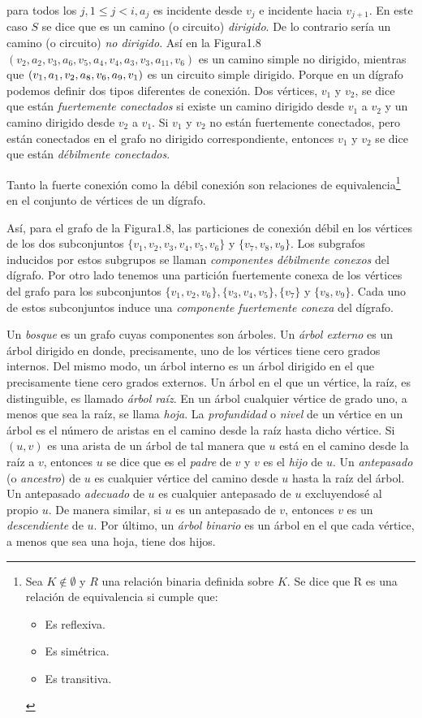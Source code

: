 \documentclass[10pt,a5paper]{book}
\begin{document}
para todos los $j, 1 \le j < i, a_j$ es incidente desde $v_j$ e incidente hacia $v_{j+1}$. En este caso $S$ se dice que es un camino (o circuito) \emph{dirigido}. De lo contrario sería un camino (o circuito) \emph{no dirigido}. Así en la Figura1.8 $(v_2,a_2,v_3,a_6,v_5,a_4,v_4,a_3,v_3,a_{11},v_6)$ es un camino simple no dirigido, mientras que $(v_1,a_1,v_2,a_8,v_6,\\a_9,v_1)$ es un circuito simple dirigido. Porque en un dígrafo podemos definir dos tipos diferentes de conexión. Dos vértices, $v_1$ y $v_2$, se dice que están \emph{fuertemente conectados} si existe un camino dirigido desde $v_1$ a $v_2$ y un camino dirigido desde $v_2$ a $v_1$. Si $v_1$ y $v_2$ no están fuertemente conectados, pero están conectados en el grafo no dirigido correspondiente, entonces $v_1$ y $v_2$ se dice que están \emph{débilmente conectados}.

Tanto la fuerte conexión como la débil conexión son relaciones de equivalencia\footnote{Sea $K \notin \emptyset$ y $R$ una relación binaria definida sobre $K$. Se dice que R es una relación de equivalencia si cumple que:\begin{itemize}
\item Es reflexiva. 
\item Es simétrica. 
\item Es transitiva.\end{itemize}} en el conjunto de vértices de un dígrafo.

Así, para el grafo de la Figura1.8, las particiones de conexión débil en los vértices de los dos subconjuntos $\{v_1,v_2,v_3,v_4,v_5,v_6\}$ y $\{v_7,v_8,v_9\}$. Los subgrafos inducidos por estos subgrupos se llaman \emph{componentes débilmente conexos} del dígrafo. Por otro lado tenemos una partición fuertemente conexa de los vértices del grafo para los subconjuntos $\{v_1,v_2,v_6\},\{v_3,v_4,v_5\},\{v_7\}$ y $\{v_8,v_9\}$. Cada uno de estos subconjuntos induce una \emph{componente fuertemente conexa} del dígrafo.

Un \emph{bosque} es un grafo cuyas componentes son árboles. Un \emph{árbol externo} es un árbol dirigido en donde, precisamente, uno de los vértices tiene cero grados internos. Del mismo modo, un árbol interno es un árbol dirigido en el que precisamente tiene cero grados externos. Un árbol en el que un vértice, la raíz, es distinguible, es llamado \emph{árbol raíz}. En un árbol cualquier vértice de grado uno, a menos que sea la raíz, se llama \emph{hoja}. La \emph{profundidad} o \emph{nivel} de un vértice en un árbol es el número de aristas en el camino desde la raíz hasta dicho vértice. Si $(u,v)$ es una arista de un árbol de tal manera que $u$ está en el camino desde la raíz a $v$, entonces $u$ se dice que es el \emph{padre} de $v$ y $v$ es el \emph{hijo} de $u$. Un \emph{antepasado} (o \emph{ancestro}) de $u$ es cualquier vértice del camino desde $u$ hasta la raíz del árbol. Un antepasado \emph{adecuado} de $u$ es cualquier antepasado de $u$ excluyendosé al propio $u$. De manera similar, si $u$ es un antepasado de $v$, entonces $v$ es un \emph{descendiente} de $u$. Por último, un \emph{árbol binario} es un árbol en el que cada vértice, a menos que sea una hoja, tiene dos hijos.
\end{document}

